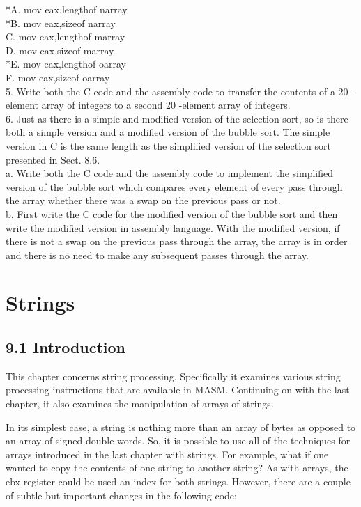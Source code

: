 \documentclass[10pt]{article}
\begin{document}
*A. mov eax,lengthof narray\\
*B. mov eax,sizeof narray\\
C. mov eax,lengthof marray\\
D. mov eax,sizeof marray\\
*E. mov eax,lengthof oarray\\
F. mov eax,sizeof oarray\\
5. Write both the C code and the assembly code to transfer the contents of a 20 -element array of integers to a second 20 -element array of integers.\\
6. Just as there is a simple and modified version of the selection sort, so is there both a simple version and a modified version of the bubble sort. The simple version in C is the same length as the simplified version of the selection sort presented in Sect. 8.6.\\
a. Write both the C code and the assembly code to implement the simplified version of the bubble sort which compares every element of every pass through the array whether there was a swap on the previous pass or not.\\
b. First write the C code for the modified version of the bubble sort and then write the modified version in assembly language. With the modified version, if there is not a swap on the previous pass through the array, the array is in order and there is no need to make any subsequent passes through the array.

\section*{Strings}
\subsection*{9.1 Introduction}
This chapter concerns string processing. Specifically it examines various string processing instructions that are available in MASM. Continuing on with the last chapter, it also examines the manipulation of arrays of strings.

In its simplest case, a string is nothing more than an array of bytes as opposed to an array of signed double words. So, it is possible to use all of the techniques for arrays introduced in the last chapter with strings. For example, what if one wanted to copy the contents of one string to another string? As with arrays, the ebx register could be used an index for both strings. However, there are a couple of subtle but important changes in the following code:
\end{document}
